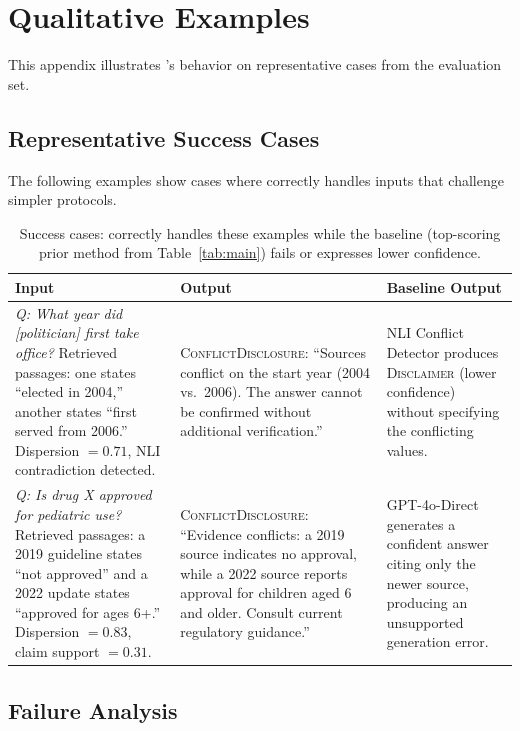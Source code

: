 \section{Qualitative Examples}
\label{app:qualitative}

This appendix illustrates \method{}'s behavior on representative cases from the evaluation set.

\subsection{Representative Success Cases}

The following examples show cases where \method{} correctly handles inputs that challenge simpler protocols.

\begin{table}[t]
\centering
\small
\begin{tabular}{p{3.5cm}p{3.5cm}p{2.5cm}}
\toprule
Input & \method{} Output & Baseline Output \\
\midrule
\emph{Q: What year did [politician] first take office?} Retrieved passages: one states ``elected in 2004,'' another states ``first served from 2006.'' Dispersion $= 0.71$, NLI contradiction detected. & \textsc{ConflictDisclosure}: ``Sources conflict on the start year (2004 vs.\ 2006). The answer cannot be confirmed without additional verification.'' & NLI Conflict Detector produces \textsc{Disclaimer} (lower confidence) without specifying the conflicting values. \\
\addlinespace
\emph{Q: Is drug X approved for pediatric use?} Retrieved passages: a 2019 guideline states ``not approved'' and a 2022 update states ``approved for ages 6+.'' Dispersion $= 0.83$, claim support $= 0.31$. & \textsc{ConflictDisclosure}: ``Evidence conflicts: a 2019 source indicates no approval, while a 2022 source reports approval for children aged 6 and older. Consult current regulatory guidance.'' & GPT-4o-Direct generates a confident answer citing only the newer source, producing an unsupported generation error. \\
\bottomrule
\end{tabular}
\caption{Success cases: \method{} correctly handles these examples while the baseline (top-scoring prior method from Table~\ref{tab:main}) fails or expresses lower confidence.}
\label{tab:qual-success}
\end{table}

\subsection{Failure Analysis}

